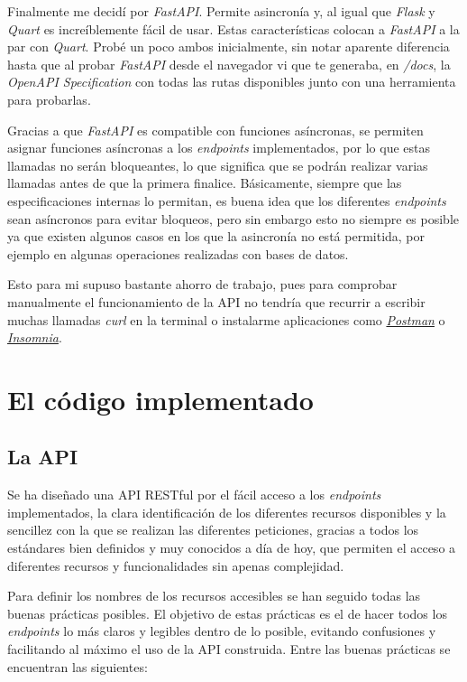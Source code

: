 Finalmente me decidí por \textit{FastAPI}. Permite asincronía y, al igual que \textit{Flask} y \textit{Quart} es increíblemente fácil de usar. Estas características colocan a \textit{FastAPI} a la par con \textit{Quart}. Probé un poco ambos inicialmente, sin notar aparente diferencia hasta que al probar \textit{FastAPI} desde el navegador vi que te generaba, en \textit{/docs}, la \textit{OpenAPI Specification} con todas las rutas disponibles junto con una herramienta para probarlas.

Gracias a que \textit{FastAPI} es compatible con funciones asíncronas, se permiten asignar funciones asíncronas a los \textit{endpoints} implementados, por lo que estas llamadas no serán bloqueantes, lo que significa que se podrán realizar varias llamadas antes de que la primera finalice. Básicamente, siempre que las especificaciones internas lo permitan, es buena idea que los diferentes \textit{endpoints} sean asíncronos para evitar bloqueos, pero sin embargo esto no siempre es posible ya que existen algunos casos en los que la asincronía no está permitida, por ejemplo en algunas operaciones realizadas con bases de datos.

Esto para mi supuso bastante ahorro de trabajo, pues para comprobar manualmente el funcionamiento de la API no tendría que recurrir a escribir muchas llamadas \textit{curl} en la terminal o instalarme aplicaciones como \href{https://www.postman.com/}{\textit{Postman}} o \href{https://insomnia.rest/}{\textit{Insomnia}}.


\section{El código implementado}

\subsection{La API}
\label{api}

Se ha diseñado una API RESTful por el fácil acceso a los \textit{endpoints} implementados, la clara identificación de los diferentes recursos disponibles y la sencillez con la que se realizan las diferentes peticiones, gracias a todos los estándares bien definidos y muy conocidos a día de hoy, que permiten el acceso a diferentes recursos y funcionalidades sin apenas complejidad.

Para definir los nombres de los recursos accesibles se han seguido todas las buenas prácticas posibles. El objetivo de estas prácticas es el de hacer todos los \textit{endpoints} lo más claros y legibles dentro de lo posible, evitando confusiones y facilitando al máximo el uso de la API construida. Entre las buenas prácticas se encuentran las siguientes:

